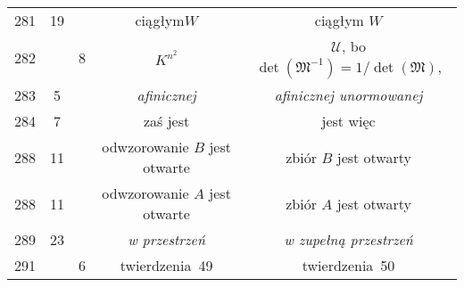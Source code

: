 \documentclass[a4paper,11pt]{article}
\begin{document}
\begin{center}
\begin{tabular}{|c|c|c|c|c|}
    281 & 19 & & ciągłym$W$ & ciągłym $W$ \\
    282 & &  8 & $K^{ n^{ 2 } }$
           & $\mathcal{U}$, bo $\det( \mathfrak{M}^{ -1 } ) = 1 / \det( \mathfrak{M} )$, \\
    283 &  5 & & \emph{afinicznej} & \emph{afinicznej unormowanej} \\
    284 &  7 & & zaś jest & jest więc \\
    288 & 11 & & odwzorowanie $B$ jest otwarte & zbiór $B$ jest otwarty \\
    288 & 11 & & odwzorowanie $A$ jest otwarte & zbiór $A$ jest otwarty \\
    289 & 23 & & \emph{w przestrzeń} & \emph{w zupełną przestrzeń} \\
    291 & &  6 & twierdzenia~49 & twierdzenia~50 \\
    \hline
  \end{tabular}


\end{center}
\end{document}
